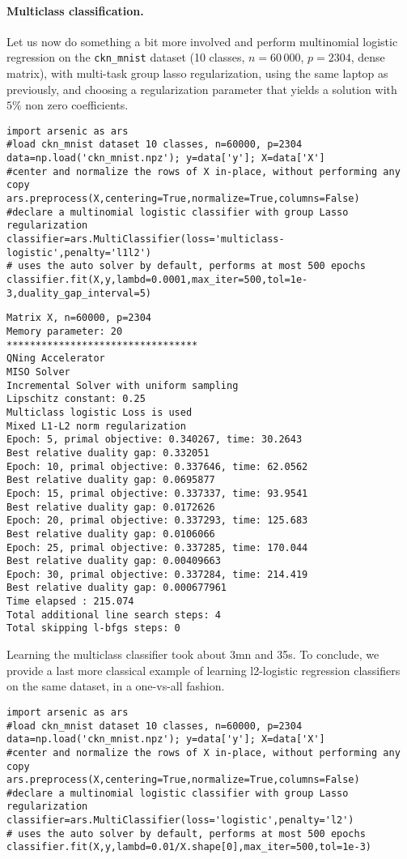 \documentclass{article}
\begin{document}
\paragraph{Multiclass classification.}
Let us now do something a bit more involved and perform multinomial logistic regression on the
\texttt{ckn\_mnist} dataset (10 classes, $n=60\,000$, $p=2304$, dense matrix), with multi-task group lasso regularization,
using the same laptop as previously, and choosing a regularization parameter that yields a solution with $5\%$ non zero coefficients.
\begin{verbatim}
import arsenic as ars
#load ckn_mnist dataset 10 classes, n=60000, p=2304
data=np.load('ckn_mnist.npz'); y=data['y']; X=data['X']
#center and normalize the rows of X in-place, without performing any copy
ars.preprocess(X,centering=True,normalize=True,columns=False) 
#declare a multinomial logistic classifier with group Lasso regularization
classifier=ars.MultiClassifier(loss='multiclass-logistic',penalty='l1l2')
# uses the auto solver by default, performs at most 500 epochs
classifier.fit(X,y,lambd=0.0001,max_iter=500,tol=1e-3,duality_gap_interval=5) 
\end{verbatim}
\begin{verbatim}
Matrix X, n=60000, p=2304
Memory parameter: 20
*********************************
QNing Accelerator
MISO Solver
Incremental Solver with uniform sampling
Lipschitz constant: 0.25
Multiclass logistic Loss is used
Mixed L1-L2 norm regularization
Epoch: 5, primal objective: 0.340267, time: 30.2643
Best relative duality gap: 0.332051
Epoch: 10, primal objective: 0.337646, time: 62.0562
Best relative duality gap: 0.0695877
Epoch: 15, primal objective: 0.337337, time: 93.9541
Best relative duality gap: 0.0172626
Epoch: 20, primal objective: 0.337293, time: 125.683
Best relative duality gap: 0.0106066
Epoch: 25, primal objective: 0.337285, time: 170.044
Best relative duality gap: 0.00409663
Epoch: 30, primal objective: 0.337284, time: 214.419
Best relative duality gap: 0.000677961
Time elapsed : 215.074
Total additional line search steps: 4
Total skipping l-bfgs steps: 0
\end{verbatim}
Learning the multiclass classifier took about 3mn and 35s. To conclude, we provide a last more classical example
of learning l2-logistic regression classifiers on the same dataset, in a one-vs-all fashion.
\begin{verbatim}
import arsenic as ars
#load ckn_mnist dataset 10 classes, n=60000, p=2304
data=np.load('ckn_mnist.npz'); y=data['y']; X=data['X']
#center and normalize the rows of X in-place, without performing any copy
ars.preprocess(X,centering=True,normalize=True,columns=False) 
#declare a multinomial logistic classifier with group Lasso regularization
classifier=ars.MultiClassifier(loss='logistic',penalty='l2')
# uses the auto solver by default, performs at most 500 epochs
classifier.fit(X,y,lambd=0.01/X.shape[0],max_iter=500,tol=1e-3) 
\end{verbatim}
\end{document}
